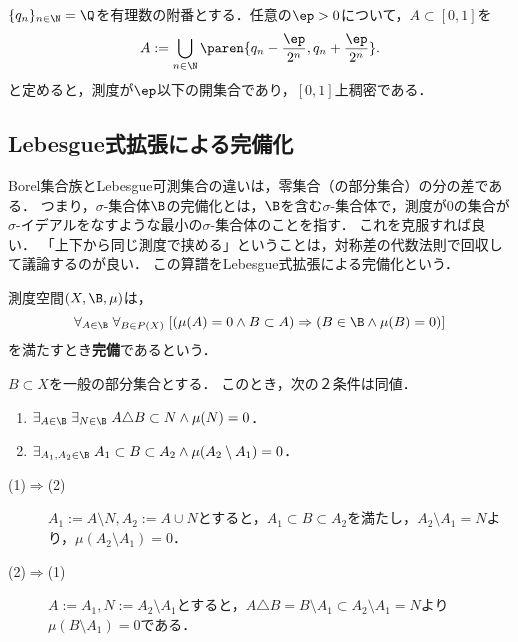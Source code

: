 \documentclass[uplatex, dvipdfmx]{jsreport}
\begin{document}
\begin{example}
    $\{q_n\}_{n\in\N}=\Q$を有理数の附番とする．任意の$\ep>0$について，$A\subset[0,1]$を
    \[A:=\bigcup_{n\in\N}\paren{q_n-\frac{\ep}{2^n},q_n+\frac{\ep}{2^n}}.\]
    と定めると，測度が$\ep$以下の開集合であり，$[0,1]$上稠密である．
\end{example}

\subsection{Lebesgue式拡張による完備化}

\begin{tcolorbox}[colframe=ForestGreen, colback=ForestGreen!10!white,breakable,colbacktitle=ForestGreen!40!white,coltitle=black,fonttitle=\bfseries\sffamily,
title=]
    Borel集合族とLebesgue可測集合の違いは，零集合（の部分集合）の分の差である．
    つまり，$\sigma$-集合体$\B$の完備化とは，$\B$を含む$\sigma$-集合体で，測度が$0$の集合が$\sigma$-イデアルをなすような最小の$\sigma$-集合体のことを指す．
    これを克服すれば良い．
    「上下から同じ測度で挟める」ということは，対称差の代数法則で回収して議論するのが良い．
    この算譜をLebesgue式拡張による完備化という．
\end{tcolorbox}

\begin{definition}[complete]
    測度空間$(X,\B,\mu)$は，
    \[\forall_{A\in\B}\;\forall_{B\in P(X)}\;[(\mu(A)=0\land B\subset A)\Rightarrow (B\in\B\land\mu(B)=0)]\]
    を満たすとき\textbf{完備}であるという．
\end{definition}

\begin{lemma}[目標の対称差による特徴付け]\label{lemma-completeness}
    $B\subset X$を一般の部分集合とする．
    このとき，次の２条件は同値．
    \begin{enumerate}
        \item $\exists_{A\in\B}\;\exists_{N\in\B}\;A\triangle B\subset N\land\mu(N)=0$．
        \item $\exists_{A_1,A_2\in\B}\;A_1\subset B\subset A_2\land\mu(A_2\setminus A_1)=0$．
    \end{enumerate}
\end{lemma}
\begin{Proof}\mbox{}
    \begin{description}
        \item[(1)$\Rightarrow$(2)] $A_1:=A\setminus N,A_2:=A\cup N$とすると，$A_1\subset B\subset A_2$を満たし，$A_2\setminus A_1=N$より，$\mu(A_2\setminus A_1)=0$．
        \item[(2)$\Rightarrow$(1)] $A:=A_1,N:=A_2\setminus A_1$とすると，$A\triangle B=B\setminus A_1\subset A_2\setminus A_1=N$より$\mu(B\setminus A_1)=0$である．
    \end{description}
\end{Proof}
\end{document}
